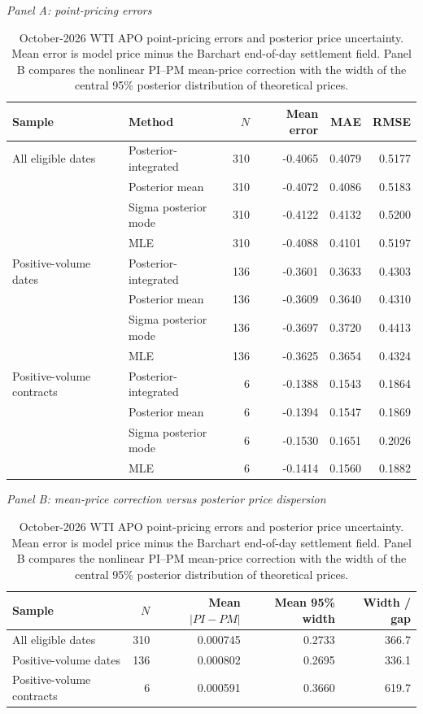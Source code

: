 \begin{table}[t]
\centering
\caption{October-2026 WTI APO point-pricing errors and posterior price uncertainty. Mean error is model price minus the Barchart end-of-day settlement field. Panel B compares the nonlinear PI--PM mean-price correction with the width of the central 95\% posterior distribution of theoretical prices.}\label{tab:oct26_empirical}

\textit{Panel A: point-pricing errors}\\[2pt]
\begin{tabular}{llrrrr}
\toprule
Sample & Method & $N$ & Mean error & MAE & RMSE\\
\midrule
All eligible dates
 & Posterior-integrated & 310 & -0.4065 & 0.4079 & 0.5177\\
 & Posterior mean & 310 & -0.4072 & 0.4086 & 0.5183\\
 & Sigma posterior mode & 310 & -0.4122 & 0.4132 & 0.5200\\
 & MLE & 310 & -0.4088 & 0.4101 & 0.5197\\
\addlinespace
Positive-volume dates
 & Posterior-integrated & 136 & -0.3601 & 0.3633 & 0.4303\\
 & Posterior mean & 136 & -0.3609 & 0.3640 & 0.4310\\
 & Sigma posterior mode & 136 & -0.3697 & 0.3720 & 0.4413\\
 & MLE & 136 & -0.3625 & 0.3654 & 0.4324\\
\addlinespace
Positive-volume contracts
 & Posterior-integrated & 6 & -0.1388 & 0.1543 & 0.1864\\
 & Posterior mean & 6 & -0.1394 & 0.1547 & 0.1869\\
 & Sigma posterior mode & 6 & -0.1530 & 0.1651 & 0.2026\\
 & MLE & 6 & -0.1414 & 0.1560 & 0.1882\\
\bottomrule
\end{tabular}

\vspace{5pt}
\textit{Panel B: mean-price correction versus posterior price dispersion}\\[2pt]
\begin{tabular}{lrrrr}
\toprule
Sample & $N$ & Mean $|PI-PM|$ & Mean 95\% width & Width / gap\\
\midrule
All eligible dates & 310 & 0.000745 & 0.2733 & 366.7\\
Positive-volume dates & 136 & 0.000802 & 0.2695 & 336.1\\
Positive-volume contracts & 6 & 0.000591 & 0.3660 & 619.7\\
\bottomrule
\end{tabular}
\end{table}

